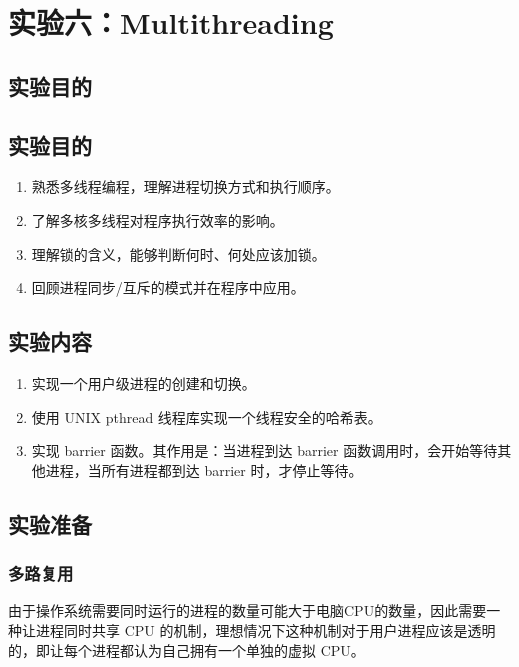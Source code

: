 \section{实验六：Multithreading}\label{sec:Multithreading}

\subsection{实验目的}

\subsection{实验目的}

\begin{enumerate}
	\item 熟悉多线程编程，理解进程切换方式和执行顺序。
	\item 了解多核多线程对程序执行效率的影响。
	\item 理解锁的含义，能够判断何时、何处应该加锁。
	\item 回顾进程同步/互斥的模式并在程序中应用。 

\end{enumerate}

\subsection{实验内容}

\begin{enumerate} 
	\item 实现一个用户级进程的创建和切换。 
	\item 使用 UNIX pthread 线程库实现一个线程安全的哈希表。 
	\item 实现 barrier 函数。其作用是：当进程到达 barrier 函数调用时，会开始等待其他进程，当所有进程都到达 barrier 时，才停止等待。 
\end{enumerate}

\subsection{实验准备}

\subsubsection{多路复用}

由于操作系统需要同时运行的进程的数量可能大于电脑CPU的数量，因此需要一种让进程同时共享 CPU 的机制，理想情况下这种机制对于用户进程应该是透明的，即让每个进程都认为自己拥有一个单独的虚拟 CPU。

